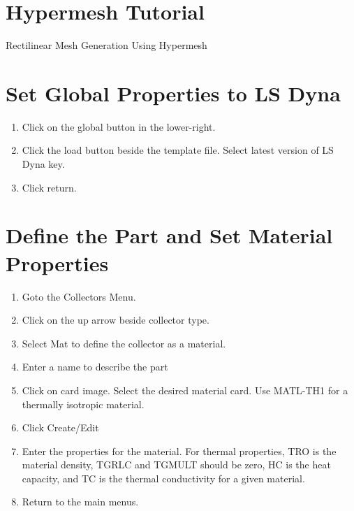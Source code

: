 \documentclass[12pt]{article}
\begin{document}
\section*{Hypermesh Tutorial}
Rectilinear Mesh Generation Using Hypermesh

\section*{Set Global Properties to LS Dyna}
\begin{enumerate}
\item Click on the global button in the lower-right.
\item Click the load button beside the template file. Select latest version of LS Dyna key.
\item Click return.
\end{enumerate}
\section*{Define the Part and Set Material Properties}
\vspace*{10Pt}
\noindent
\begin{enumerate}
\item Goto the Collectors Menu.
\item Click on the up arrow beside collector type.
\item Select Mat to define the collector as a material.
\item Enter a name to describe the part
\item Click on card image. Select the desired material card. Use MATL-TH1
for a thermally isotropic material.
\item Click Create/Edit
\item Enter the properties for the material. For thermal properties, TRO is 
the material density, TGRLC and TGMULT should be zero, HC is the heat capacity,
and TC is the thermal conductivity for a given material.
\item Return to the main menus.
\end{enumerate}
\end{document}
